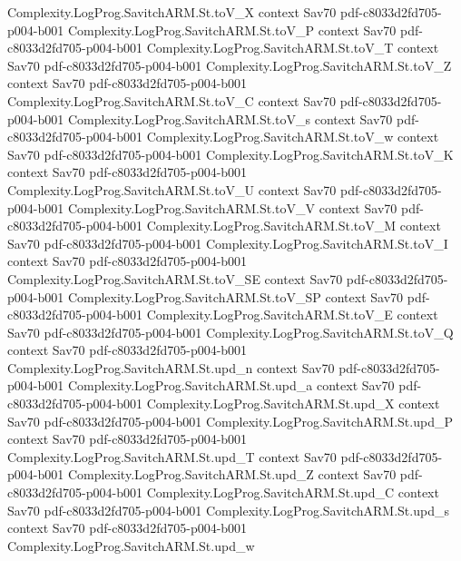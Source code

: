 \begin{theorem}
\proofstep
  {Complexity.LogProg.SavitchARM.St.toV_X}
  {context}
  {Sav70}
  {pdf-c8033d2fd705-p004-b001}
\proofstep
  {Complexity.LogProg.SavitchARM.St.toV_P}
  {context}
  {Sav70}
  {pdf-c8033d2fd705-p004-b001}
\proofstep
  {Complexity.LogProg.SavitchARM.St.toV_T}
  {context}
  {Sav70}
  {pdf-c8033d2fd705-p004-b001}
\proofstep
  {Complexity.LogProg.SavitchARM.St.toV_Z}
  {context}
  {Sav70}
  {pdf-c8033d2fd705-p004-b001}
\proofstep
  {Complexity.LogProg.SavitchARM.St.toV_C}
  {context}
  {Sav70}
  {pdf-c8033d2fd705-p004-b001}
\proofstep
  {Complexity.LogProg.SavitchARM.St.toV_s}
  {context}
  {Sav70}
  {pdf-c8033d2fd705-p004-b001}
\proofstep
  {Complexity.LogProg.SavitchARM.St.toV_w}
  {context}
  {Sav70}
  {pdf-c8033d2fd705-p004-b001}
\proofstep
  {Complexity.LogProg.SavitchARM.St.toV_K}
  {context}
  {Sav70}
  {pdf-c8033d2fd705-p004-b001}
\proofstep
  {Complexity.LogProg.SavitchARM.St.toV_U}
  {context}
  {Sav70}
  {pdf-c8033d2fd705-p004-b001}
\proofstep
  {Complexity.LogProg.SavitchARM.St.toV_V}
  {context}
  {Sav70}
  {pdf-c8033d2fd705-p004-b001}
\proofstep
  {Complexity.LogProg.SavitchARM.St.toV_M}
  {context}
  {Sav70}
  {pdf-c8033d2fd705-p004-b001}
\proofstep
  {Complexity.LogProg.SavitchARM.St.toV_I}
  {context}
  {Sav70}
  {pdf-c8033d2fd705-p004-b001}
\proofstep
  {Complexity.LogProg.SavitchARM.St.toV_SE}
  {context}
  {Sav70}
  {pdf-c8033d2fd705-p004-b001}
\proofstep
  {Complexity.LogProg.SavitchARM.St.toV_SP}
  {context}
  {Sav70}
  {pdf-c8033d2fd705-p004-b001}
\proofstep
  {Complexity.LogProg.SavitchARM.St.toV_E}
  {context}
  {Sav70}
  {pdf-c8033d2fd705-p004-b001}
\proofstep
  {Complexity.LogProg.SavitchARM.St.toV_Q}
  {context}
  {Sav70}
  {pdf-c8033d2fd705-p004-b001}
\proofstep
  {Complexity.LogProg.SavitchARM.St.upd_n}
  {context}
  {Sav70}
  {pdf-c8033d2fd705-p004-b001}
\proofstep
  {Complexity.LogProg.SavitchARM.St.upd_a}
  {context}
  {Sav70}
  {pdf-c8033d2fd705-p004-b001}
\proofstep
  {Complexity.LogProg.SavitchARM.St.upd_X}
  {context}
  {Sav70}
  {pdf-c8033d2fd705-p004-b001}
\proofstep
  {Complexity.LogProg.SavitchARM.St.upd_P}
  {context}
  {Sav70}
  {pdf-c8033d2fd705-p004-b001}
\proofstep
  {Complexity.LogProg.SavitchARM.St.upd_T}
  {context}
  {Sav70}
  {pdf-c8033d2fd705-p004-b001}
\proofstep
  {Complexity.LogProg.SavitchARM.St.upd_Z}
  {context}
  {Sav70}
  {pdf-c8033d2fd705-p004-b001}
\proofstep
  {Complexity.LogProg.SavitchARM.St.upd_C}
  {context}
  {Sav70}
  {pdf-c8033d2fd705-p004-b001}
\proofstep
  {Complexity.LogProg.SavitchARM.St.upd_s}
  {context}
  {Sav70}
  {pdf-c8033d2fd705-p004-b001}
\proofstep
  {Complexity.LogProg.SavitchARM.St.upd_w}

\end{theorem}
